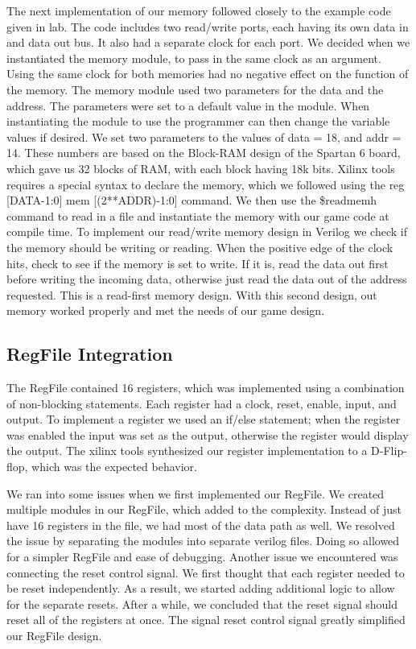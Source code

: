 \documentclass[letterpaper, 11 pt, conference]{article}
\begin{document}
The next implementation of our memory followed closely to the example code given in lab. The code includes two read/write ports, each having its own data in and data out bus. It also had a separate clock for each port. We decided when we instantiated the memory module, to pass in the same clock as an argument. Using the same clock for both memories had no negative effect on the function of the memory. The memory module used two parameters for the data and the address. The parameters were set to a default value in the module. When instantiating the module to use the programmer can then change the variable values if desired. We set two parameters to the values of data = 18, and addr = 14. These numbers are based on the Block-RAM design of the Spartan 6 board, which gave us 32 blocks of RAM, with each block having 18k bits. Xilinx tools requires a special syntax to declare the memory, which we followed using the reg [DATA-1:0] mem [(2**ADDR)-1:0] command. We then use the \$readmemh command to read in a file and instantiate the memory with our game code at compile time. To implement our read/write memory design in Verilog we check if the memory should be writing or reading. When the positive edge of the clock hits, check to see if the memory is set to write. If it is, read the data out first before writing the incoming data, otherwise just read the data out of the address requested. This is a read-first memory design. With this second design, out memory worked properly and met the needs of our game design.

\subsection{RegFile Integration}
    The RegFile contained 16 registers, which was implemented using a combination of non-blocking statements. Each register had a clock, reset, enable, input, and output. To implement a register we used an if/else statement; when the register was enabled the input was set as the output, otherwise the register would display the output. The xilinx tools synthesized our register implementation to a D-Flip-flop, which was the expected behavior. 

    We ran into some issues when we first implemented our RegFile. We created multiple modules in our RegFile, which added to the complexity. Instead of just have 16 registers in the file, we had most of the data path as well. We resolved the issue by separating the modules into separate verilog files. Doing so allowed for a simpler RegFile and ease of debugging. Another issue we encountered was connecting the reset control signal. We first thought that each register needed to be reset independently. As a result, we started adding additional logic to allow for the separate resets. After a while, we concluded that the reset signal should reset all of the registers at once. The signal reset control signal greatly simplified our RegFile design. 
\end{document}
